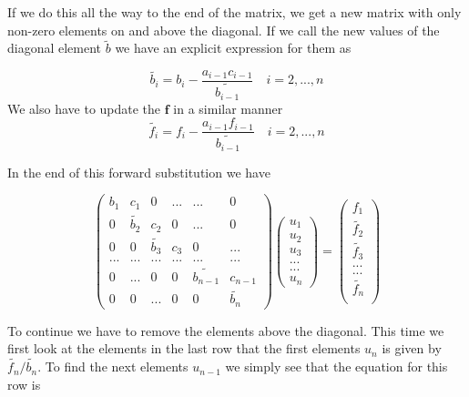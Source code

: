 \documentclass[a4paper,11pt]{article}
\begin{document}
{If we do this all the way to the end of the matrix, we get a new matrix with only non-zero elements on and above the diagonal. If we call the new values of the diagonal element $\tilde{b}$ we have an explicit expression for them as
		
\begin{equation}
\tilde{b_i}=b_{i}-\frac{a_{i-1}c_{i-1}}{\tilde{b_{i-1}}}\quad i = 2, ..., n
\label{eq:forward_general_b}
\end{equation}
We also have to update the $\mathbf{f}$ in a similar manner
\begin{equation}
\tilde{f_i}=f_{i}-\frac{a_{i-1}f_{i-1}}{\tilde{b_{i-1}}}\quad i = 2, ..., n
\label{eq:forward_general_f}
\end{equation}
		
In the end of this forward substitution we have
		
\begin{equation}
\begin{pmatrix}
b_1 & c_1 & 0 & ... & ... & 0 \\
0 & \tilde{b_2} & c_2 & 0 & ... & 0 \\
0 & 0 & \tilde{b_3} & c_3 & 0 & ... \\
... & ... & ... & ... & ... & ... \\
0 & ... & 0 & 0 & \tilde{b_{n-1}} & c_{n-1} \\
0 & 0 & ... & 0 & 0 & \tilde{b_{n}}
\end{pmatrix} \begin{pmatrix}
u_1\\
u_2\\
u_3\\
...\\
...\\
u_n
\end{pmatrix} = \begin{pmatrix}
f_1 \\
\tilde{f_2} \\
\tilde{f_3} \\
... \\
... \\
\tilde{f_n} \\
\end{pmatrix}
\end{equation}
		
To continue we have to remove the elements above the diagonal. This time we first look at the elements in the last row that the first elements $u_n$ is given by $\tilde{f_n}/\tilde{b_n}$. To find the next elements $u_{n-1}$ we simply see that the equation for this row is 
		
}
\end{document}
